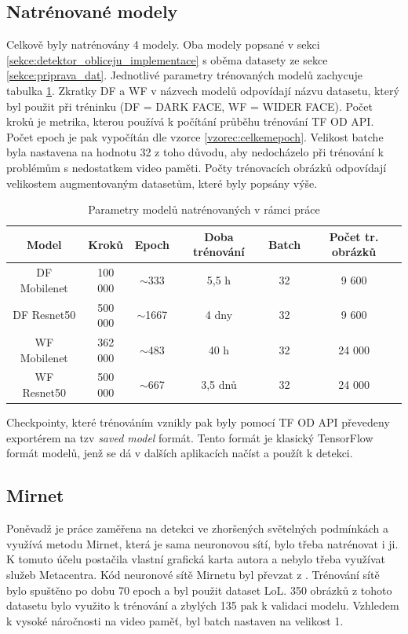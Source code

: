 \subsection*{Natrénované modely}
Celkově byly natrénovány 4 modely. Oba modely popsané v sekci \ref{sekce:detektor_obliceju_implementace} s oběma datasety ze sekce \ref{sekce:priprava_dat}. Jednotlivé parametry trénovaných modelů zachycuje tabulka \ref{tabulka:trenovanimodely}. Zkratky  DF a WF v názvech modelů odpovídají názvu datasetu, který byl použit při tréninku (DF = DARK FACE, WF = WIDER FACE). Počet kroků je metrika, kterou používá k počítání průběhu trénování TF OD API. Počet epoch je pak vypočítán dle vzorce \ref{vzorec:celkemepoch}. Velikost batche byla nastavena na hodnotu 32 z toho důvodu, aby nedocházelo při trénování k problémům s nedostatkem video paměti. Počty trénovacích obrázků odpovídají velikostem augmentovaným datasetům, které byly popsány výše.

\begin{table}[h]
  \begin{tabular}{|c|c|c|c|c|c|}
    \hline
    \rowcolor[HTML]{E0DBDB} 
    {\color[HTML]{333333} \textbf{Model}} & {\color[HTML]{333333} \textbf{Kroků}} & {\color[HTML]{333333} \textbf{Epoch}} & {\color[HTML]{333333} \textbf{Doba trénování}} & {\color[HTML]{333333} \textbf{Batch}} & {\color[HTML]{333333} \textbf{Počet tr. obrázků}} \\ \hline
    DF Mobilenet  & 100 000 & $\sim$333 & 5,5 h  & 32  & 9 600        \\ \hline
    DF Resnet50  & 500 000  & $\sim$1667   & 4 dny  & 32  & 9 600   \\ \hline
    WF Mobilenet    & 362 000      & $\sim$483 & 40 h   & 32  & 24 000  \\ \hline
    WF Resnet50   & 500 000  & $\sim$667  & 3,5 dnů   & 32  & 24 000  \\ \hline
  \end{tabular}
  \label{tabulka:trenovanimodely}
  \caption{Parametry modelů natrénovaných v rámci práce}
\end{table}

Checkpointy, které trénováním vznikly pak byly pomocí TF OD API převedeny exportérem na tzv \emph{saved model} formát. Tento formát je klasický TensorFlow formát modelů, jenž se dá v dalších aplikacích načíst a použít k detekci.

\subsection*{Mirnet}
Poněvadž je práce zaměřena na detekci ve zhoršených světelných podmínkách a využívá metodu Mirnet, která je sama neuronovou sítí, bylo třeba natrénovat i ji. K tomuto účelu postačila vlastní grafická karta autora a nebylo třeba využívat služeb Metacentra. Kód neuronové sítě Mirnetu byl převzat z \cite{mirnet}. Trénování sítě bylo spuštěno po dobu 70 epoch a byl použit dataset LoL. 350 obrázků z tohoto datasetu bylo využito k trénování a zbylých 135 pak k validaci modelu. Vzhledem k vysoké náročnosti na video paměť, byl batch nastaven na velikost 1. 



